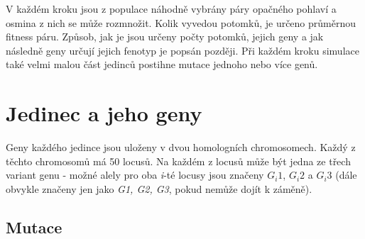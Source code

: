 V každém kroku jsou z populace náhodně vybrány páry opačného pohlaví a osmina z nich se může rozmnožit. Kolik
vyvedou potomků, je určeno průměrnou fitness páru. Způsob, jak je jsou určeny počty potomků, jejich geny a
jak následně geny určují jejich fenotyp je popsán později.
Při každém kroku simulace také velmi malou část jedinců postihne mutace jednoho nebo více genů.

\section{Jedinec a jeho geny}

Geny každého jedince jsou uloženy v dvou homologních chromosomech. Každý z těchto chromosomů má 50 locusů.
Na každém z locusů může být jedna ze třech variant genu - možné alely pro oba \textit{i}-té locusy jsou
značeny $G_i{}1$, $G_i{}2$ a $G_i{}3$ (dále obvykle značeny jen jako \textit{G1, G2, G3}, pokud
nemůže dojít k záměně).


\subsection{Mutace}


